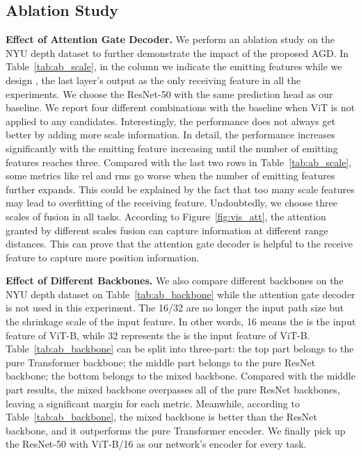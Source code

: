 \documentclass[10pt,twocolumn,letterpaper]{article}
\begin{document}
\subsection{Ablation Study}
\noindent \textbf{Effect of Attention Gate Decoder.}
We perform an ablation study on the NYU depth dataset to further demonstrate the impact of the proposed AGD. 
In Table~\ref{tab:ab_scale}, in the  column we indicate the emitting features while we design , the last layer's output as the only receiving feature in all the experiments. 
We choose the ResNet-50 with the same prediction head as our baseline.
We report four different combinations with the baseline when ViT is not applied to any candidates. Interestingly, the performance does not always get better by adding more scale information. In detail, the performance increases significantly with the emitting feature increasing until the number of emitting features reaches three. Compared with the last two rows in Table~\ref{tab:ab_scale}, some metrics like rel and rms go worse when the number of emitting features further expands. This could be explained by the fact that too many scale features may lead to overfitting of the receiving feature. Undoubtedly, we choose three scales of fusion in all tasks.
According to Figure~\ref{fig:vis_att}, the attention granted by different scales fusion can capture information at different range distances. This can prove that the attention gate decoder is helpful to the receive feature to capture more position information. 

\noindent \textbf{Effect of Different Backbones.}
We also compare different backbones on the NYU depth dataset on Table~\ref{tab:ab_backbone} while the attention gate decoder is not used in this experiment. The 16/32 are no longer the input path size but the shrinkage scale of the input feature. In other words, 16 means the  is the input feature of ViT-B, while 32 represents the  is the input feature of ViT-B.
Table~\ref{tab:ab_backbone} can be split into three-part: the top part belongs to the pure Transformer backbone; the middle part belongs to the pure ResNet backbone; the bottom belongs to the mixed backbone. 
Compared with the middle part results, the mixed backbone overpasses all of the pure ResNet backbones, leaving a significant margin for each metric. Meanwhile, according to Table~\ref{tab:ab_backbone}, the mixed backbone is better than the ResNet backbone, and it outperforms the pure Transformer encoder. 
We finally pick up the ResNet-50 with ViT-B/16 as our network's encoder for every task.
\end{document}
